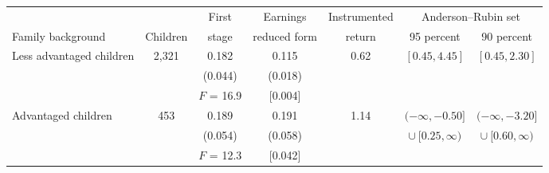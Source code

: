 \setlength{\tabcolsep}{5pt}
\begin{tabular}{@{}lcccccc@{}}
\toprule
& & First & Earnings & Instrumented & \multicolumn{2}{c}{Anderson--Rubin set} \\
\cmidrule(lr){6-7}
Family background & Children & stage & reduced form & return & 95 percent & 90 percent \\
\midrule
Less advantaged children & 2,321 & 0.182\rlap{**} & 0.115\rlap{***} & 0.62 & $[0.45, 4.45]$ & $[0.45, 2.30]$ \\
 &  & (0.044) & (0.018) &  &  &  \\
 &  & $F$ = 16.9 & [0.004] &  &  &  \\
Advantaged children & 453 & 0.189\rlap{*} & 0.191\rlap{**} & 1.14 & $(-\infty, -0.50]$ & $(-\infty, -3.20]$ \\
 &  & (0.054) & (0.058) &  & $\cup\ [0.25, \infty)$ & $\cup\ [0.60, \infty)$ \\
 &  & $F$ = 12.3 & [0.042] &  &  &  \\
\bottomrule
\end{tabular}
